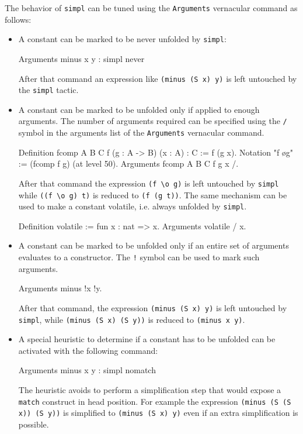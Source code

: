 \begin{coq_example*}
The behavior of {\tt simpl} can be tuned using the {\tt Arguments} vernacular
command as follows:
\begin{itemize}
\item
A constant can be marked to be never unfolded by {\tt simpl}:
\begin{coq_example*}
Arguments minus x y : simpl never
\end{coq_example*}
After that command an expression like {\tt (minus (S x) y)} is left untouched by
the {\tt simpl} tactic.
\item
A constant can be marked to be unfolded only if applied to enough arguments.
The number of arguments required can be specified using
the {\tt /} symbol in the arguments list of the {\tt Arguments} vernacular
command.
\begin{coq_example*}
Definition fcomp A B C f (g : A -> B) (x : A) : C := f (g x).
Notation "f \o g" := (fcomp f g) (at level 50).
Arguments fcomp {A B C} f g x /.
\end{coq_example*}
After that command the expression {\tt (f \verb+\+o g)} is left untouched by
{\tt simpl} while {\tt ((f \verb+\+o g) t)} is reduced to {\tt (f (g t))}.
The same mechanism can be used to make a constant volatile, i.e. always
unfolded by {\tt simpl}.
\begin{coq_example*}
Definition volatile := fun x : nat => x.
Arguments volatile / x.
\end{coq_example*}
\item
A constant can be marked to be unfolded only if an entire set of arguments
evaluates to a constructor. The {\tt !} symbol can be used to mark such
arguments.
\begin{coq_example*}
Arguments minus !x !y.
\end{coq_example*}
After that command, the expression {\tt (minus (S x) y)} is left untouched by
{\tt simpl}, while {\tt (minus (S x) (S y))} is reduced to {\tt (minus x y)}.
\item
A special heuristic to determine if a constant has to be unfolded can be
activated with the following command:
\begin{coq_example*}
Arguments minus x y : simpl nomatch
\end{coq_example*}
The heuristic avoids to perform a simplification step that would
expose a {\tt match} construct in head position. For example the
expression {\tt (minus (S (S x)) (S y))} is simplified to
{\tt (minus (S x) y)} even if an extra simplification is possible.
\end{itemize}


\end{coq_example*}
